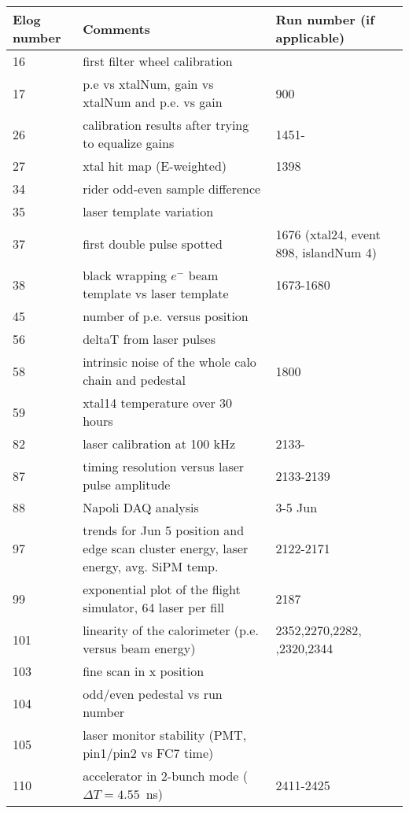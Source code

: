 \begin{longtable}{|p{1.5cm}|p{9.5cm}|p{4cm}|} \hline
Elog number &  Comments & Run number \newline (if applicable)\\ \hline
16 & first filter wheel calibration & \\ \hline
17 & p.e vs xtalNum, gain vs xtalNum and p.e. vs gain & 900 \\ \hline
26 & calibration results after trying to equalize gains & 1451- \\ \hline
27 & xtal hit map (E-weighted) & 1398 \\ \hline
34 & rider odd-even sample difference & \\ \hline
35 & laser template variation & \\ \hline
37 & first double pulse spotted & 1676 (xtal24, event 898, islandNum 4) \\ \hline
38 & black wrapping $e^{-}$ beam template vs laser template & 1673-1680 \\ \hline
45 & number of p.e. versus position & \\ \hline
56 & deltaT from laser pulses & \\ \hline
58 & intrinsic noise of the whole calo chain and pedestal & 1800 \\ \hline
59 & xtal14 temperature over 30 hours & \\ \hline
82 & laser calibration at 100 kHz & 2133- \\ \hline
87 & timing resolution versus laser pulse amplitude & 2133-2139 \\ \hline
88 & Napoli DAQ analysis & 3-5 Jun \\ \hline
97 & trends for Jun 5 position and edge scan \newline cluster energy, laser energy, avg. SiPM temp. & 2122-2171 \\ \hline
99 & exponential plot of the flight simulator, 64 laser per fill & 2187 \\ \hline
101 & linearity of the calorimeter (p.e. versus beam energy) & 2352,2270,2282, \newline 2308,2320,2344 \\ \hline
103 & fine scan in x position & \\ \hline
104 & odd/even pedestal vs run number & \\ \hline
105 & laser monitor stability (PMT, pin1/pin2 vs FC7 time) & \\ \hline
110 & accelerator in 2-bunch mode ($\Delta T = 4.55$~ns) & 2411-2425 \\ \hline

\end{longtable}
